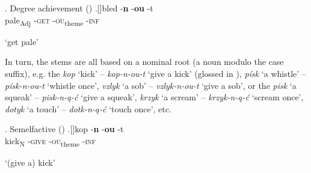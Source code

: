 \ex. Degree achievement ()\label{bled}
\ag.[]\hspace{-22pt}bled -\textbf{n} -\textbf{ou} -t \\
\hspace{-22pt}pale\textsubscript{Adj} {\color{white}-}\textsc{get} {\color{white}-}\textsc{ou}\textsubscript{theme} 
{\color{white}-}\textsc{inf}\\
\hspace{-22pt}\strut `get pale'

\noindent
In turn, the  stems are all based on a nominal root (a noun modulo the case suffix), e.g. the  \textit{kop} `kick' -- \textit{kop-n-ou-t} `give a kick' (glossed in \Next), \textit{p\'isk} `a whistle' -- \textit{p\'isk-n-ou-t} `whistle once', \textit{vzlyk} `a sob' -- \textit{vzlyk-n-ou-t} `give a sob', or the  \textit{pisk} `a squeak' -- \textit{pisk-n-\k{a}-\'c} `give a squeak', \textit{krzyk} `a scream' -- \textit{krzyk-n-\k{a}-\'c} `scream once', \textit{dotyk} `a touch' -- \textit{dotk-n-\k{a}-\'c} `touch once', etc. 

\ex. Semelfactive ()\label{gloss:sem}
\ag.[]\hspace{-22pt}kop -\textbf{n} -\textbf{ou} -t \\
\hspace{-22pt}kick\textsubscript{N} {\color{white}-}\textsc{give} {\color{white}-}\textsc{ou}\textsubscript{theme} 
{\color{white}-}\textsc{inf}\\
\hspace{-22pt}\strut `(give a) kick'

